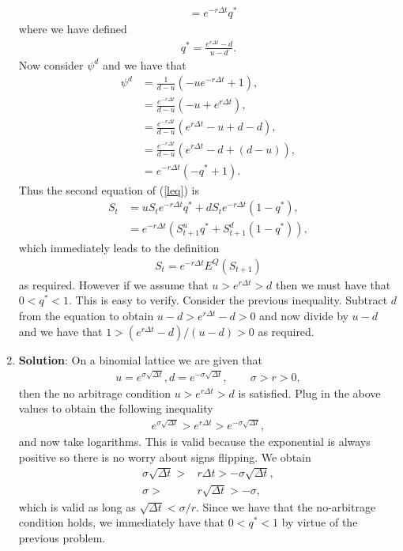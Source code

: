 \documentclass[10pt,english]{article}
\theoremstyle{plain}
\newcommand{\dt}{\Delta t}
\begin{document}
\begin{enumerate}
\begin{align*}
&= e^{-r\Delta t}q^{*}
\end{align*}
where we have defined 
\begin{align}
q^{*}=\frac{e^{r\Delta t}-d}{u-d}.
\end{align}
Now consider $\psi^{d}$ and we have that
\begin{align*}
\psi^{d}&=\frac{1}{d-u}(-ue^{-r\Delta t} + 1),\\
&=\frac{e^{-r\Delta t}}{d-u}(-u+e^{r\Delta t}),\\
&=\frac{e^{-r\Delta t}}{d-u}(e^{r\Delta t}-u+d-d),\\
&=\frac{e^{-r\Delta t}}{d-u}(e^{r\Delta t}-d+(d-u)),\\
&= e^{-r\Delta t}(-q^{*}+1).
\end{align*}
Thus the second equation of (\ref{leq}) is 
\begin{align*}
S_{t} &= uS_{t}e^{-r\Delta t}q^{*} + dS_{t}e^{-r\Delta t}(1-q^{*}),\\
&= e^{-r\Delta t}(S_{t+1}^{u}q^{*} + S_{t+1}^{d}(1-q^{*})),
\end{align*}
which immediately leads to the definition
\begin{align}
\boxed{S_{t}=e^{-r\Delta t}E^{Q}(S_{t+1})} 
\end{align}
as required. However if we assume that $u>e^{r\Delta t}>d$ then we must have that $0<q^{*}<1.$ This is easy to verify. Consider the previous inequality. Subtract $d$ from the equation to obtain $u-d > e^{r\Delta t} -d > 0$ and now divide by $u-d$ and we have that $1 > (e^{r\Delta t}-d)/(u-d)> 0$ as required. 


\item \textbf{Solution}: On a binomial lattice we are given that
\begin{align*}
u=e^{\sigma\sqrt{\dt}}, d=e^{-\sigma\sqrt{\dt}},\qquad \sigma > r > 0,
\end{align*}
then the no arbitrage condition $u>e^{r\Delta t}>d$ is satisfied. Plug in the above values to obtain the following inequality
\begin{align*}
e^{\sigma\sqrt{\dt}}> e^{r\Delta t}>e^{-\sigma\sqrt{\dt}},
\end{align*}
and now take logarithms. This is valid because the exponential is always positive so there is no worry about signs flipping. We obtain
\begin{align*}
\sigma\sqrt{\dt} > &r\dt > -\sigma\sqrt{\dt},\\
\sigma > &r\sqrt{\dt} > -\sigma,
\end{align*}
which is valid as long as $\sqrt{\dt} < \sigma /r$. Since we have that the no-arbitrage condition holds, we immediately have that $0<q^{*}<1$ by virtue of the previous problem.


\end{enumerate}
\end{document}

